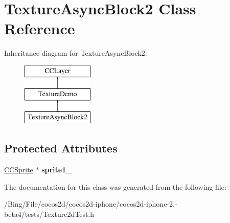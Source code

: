 \hypertarget{interface_texture_async_block2}{\section{Texture\-Async\-Block2 Class Reference}
\label{interface_texture_async_block2}
}
Inheritance diagram for Texture\-Async\-Block2\-:\begin{figure}[H]
\begin{center}
\leavevmode
\includegraphics[height=3.000000cm]{interface_texture_async_block2}
\end{center}
\end{figure}
\subsection*{Protected Attributes}
\begin{DoxyCompactItemize}
\item 
\hypertarget{interface_texture_async_block2_a17b74ff84619b5a25bffdf36767cf3d5}{\hyperlink{class_c_c_sprite}{C\-C\-Sprite} $\ast$ {\bfseries sprite1\-\_\-}}\label{interface_texture_async_block2_a17b74ff84619b5a25bffdf36767cf3d5}

\end{DoxyCompactItemize}


The documentation for this class was generated from the following file\-:\begin{DoxyCompactItemize}
\item 
/\-Bing/\-File/cocos2d/cocos2d-\/iphone/cocos2d-\/iphone-\/2.-\/beta4/tests/Texture2d\-Test.\-h\end{DoxyCompactItemize}
